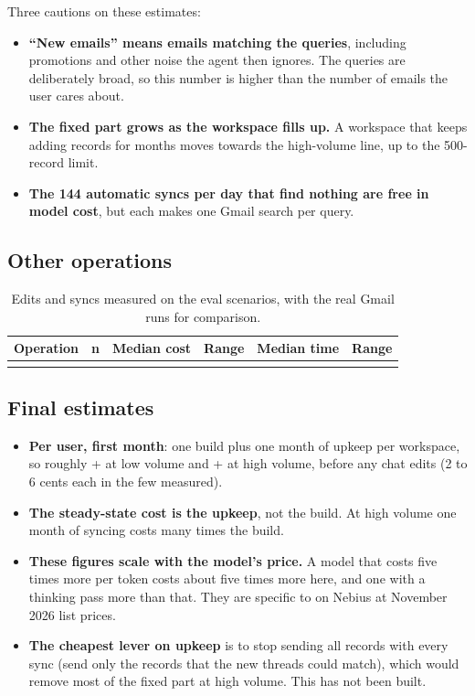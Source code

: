 Three cautions on these estimates:
\begin{itemize}
\item \textbf{``New emails'' means emails matching the queries}, including promotions and other noise the agent then ignores. The queries are deliberately broad, so this number is higher than the number of emails the user cares about.
\item \textbf{The fixed part grows as the workspace fills up.} A workspace that keeps adding records for months moves towards the high-volume line, up to the 500-record limit.
\item \textbf{The 144 automatic syncs per day that find nothing are free in model cost}, but each makes one Gmail search per query.
\end{itemize}

\subsection{Other operations}

\begin{table}[H]
\centering\small
\begin{tabularx}{0.92\linewidth}{@{}Lrrrrr@{}}
\toprule
\textbf{Operation} & \textbf{n} & \textbf{Median cost} & \textbf{Range} & \textbf{Median time} & \textbf{Range} \\
\midrule
{}
\bottomrule
\end{tabularx}
\caption{Edits and syncs measured on the eval scenarios, with the real Gmail runs for
comparison.}
\end{table}

\subsection{Final estimates}



\begin{itemize}
\item \textbf{Per user, first month}: one build plus one month of upkeep per workspace, so roughly \Nbuildlowcost{} + \Nupkeeplow{} at low volume and \Nbuildhighcost{} + \Nupkeephigh{} at high volume, before any chat edits (2 to 6 cents each in the few measured).
\item \textbf{The steady-state cost is the upkeep}, not the build. At high volume one month of syncing costs many times the build.
\item \textbf{These figures scale with the model's price.} A model that costs five times more per token costs about five times more here, and one with a thinking pass more than that. They are specific to  on Nebius at November 2026 list prices.
\item \textbf{The cheapest lever on upkeep} is to stop sending all records with every sync (send only the records that the new threads could match), which would remove most of the fixed part at high volume. This has not been built.
\end{itemize}

